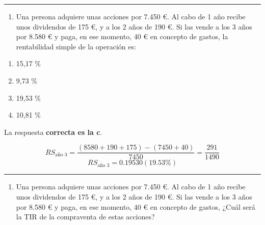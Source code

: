 \documentclass[
  letterpaper,
  DIV=11,
  numbers=noendperiod]{scrreprt}
\providecommand{\tightlist}{%
  \setlength{\itemsep}{0pt}\setlength{\parskip}{0pt}}\usepackage{longtable,booktabs,array}
\begin{document}
\begin{center}\rule{0.5\linewidth}{0.5pt}\end{center}

\begin{enumerate}
\def\labelenumi{\arabic{enumi}.}
\setcounter{enumi}{102}
\tightlist
\item
  Una persona adquiere unas acciones por 7.450 €. Al cabo de 1 año
  recibe unos dividendos de 175 €, y a los 2 años de 190 €. Si las vende
  a los 3 años por 8.580 € y paga, en ese momento, 40 € en concepto de
  gastos, la rentabilidad simple de la operación es:
\end{enumerate}

\begin{enumerate}
\def\labelenumi{\alph{enumi}.}
\item
  15,17 \%
\item
  9,73 \%
\item
  19,53 \%
\item
  10,81 \%
\end{enumerate}

\begin{tcolorbox}[enhanced jigsaw, left=2mm, opacityback=0, colback=white, breakable, arc=.35mm, bottomrule=.15mm, rightrule=.15mm, toprule=.15mm, leftrule=.75mm, colframe=quarto-callout-tip-color-frame]
\begin{minipage}[t]{5.5mm}
\textcolor{quarto-callout-tip-color}{\faLightbulb}
\end{minipage}%
\begin{minipage}[t]{\textwidth - 5.5mm}

La respuesta \textbf{correcta es la c}.

\[RS_{\text{año 3}}=\frac{\left(8580+190+175\right)-\left(7450+40\right)}{7450}=\frac{291}{1490}\]
\[RS_{\text{año 3}}=0.19530(19.53\%)\]

\end{minipage}%
\end{tcolorbox}

\begin{center}\rule{0.5\linewidth}{0.5pt}\end{center}

\begin{enumerate}
\def\labelenumi{\arabic{enumi}.}
\setcounter{enumi}{103}
\tightlist
\item
  Una persona adquiere unas acciones por 7.450 €. Al cabo de 1 año
  recibe unos dividendos de 175 €, y a los 2 años de 190 €. Si las vende
  a los 3 años por 8.580 € y paga, en ese momento, 40 € en concepto de
  gastos, ¿Cuál será la TIR de la compraventa de estas acciones?
\end{enumerate}
\end{document}
